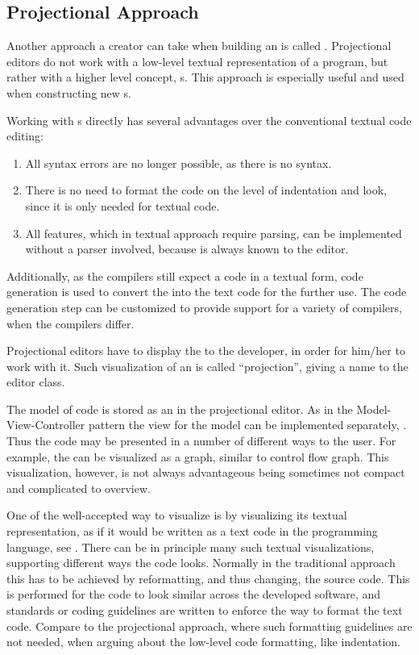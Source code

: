 \subsection{Projectional Approach}

Another approach a creator can take when building an   is called . 
Projectional editors do not work with a low-level textual representation of a program, but rather with a higher level concept, s.
This approach is especially useful and used when constructing new s.

Working with s directly has several advantages over the conventional textual code editing:

\begin{enumerate}
 \item All syntax errors are no longer possible, as there is no syntax. 
 \item There is no need to format the code on the level of indentation and look, since it is only
needed for textual code.
  \item All features, which in textual approach require parsing, can be implemented without a parser involved, because  is always known to the editor.
\end{enumerate}

Additionally, as the compilers still expect a code in a textual form, code generation is used to
convert the  into the text code for the further use. The code generation step can be 
customized to provide support for a variety of compilers, when the compilers differ.

Projectional editors have to display the  to the developer, in order for him/her to work with it. Such visualization
of an  is called ``projection'', giving a name to the editor class.

The model of code is stored as an  in the projectional editor. As in the Model-View-Controller pattern the view for
the model can be implemented separately, \cite{GOF95}. Thus the code may be presented in a number of different ways to the user. For example, the  can be visualized as a graph, similar to control flow graph. This visualization, however, is not always advantageous being sometimes not compact and
complicated to overview.


One of the well-accepted way to visualize  is by visualizing its textual representation, as if
it would be written as a text code in the programming language, see . There can be in  
principle many such textual visualizations, supporting different ways the code looks. Normally in 
the traditional approach this has to be achieved by reformatting, and thus changing, the source code.
This is performed for the code to look similar across the developed software, and standards or coding 
guidelines are written to enforce the way to format the text code. Compare to the projectional approach,
where such formatting guidelines are not needed, when arguing about the low-level code formatting,
like indentation.

